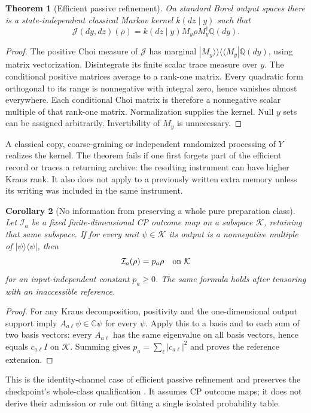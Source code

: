\documentclass[11pt,oneside,openany]{book}
\newtheorem{theorem}{Theorem}[chapter]
\newtheorem{corollary}[theorem]{Corollary}
\theoremstyle{definition}
\theoremstyle{remark}\newtheorem{remark}[theorem]{Remark}
\begin{document}
\begin{theorem}[Efficient passive refinement]
\label{cpc:thm:refinement}
On standard Borel output spaces there is a state-independent classical Markov kernel $k(dz\mid y)$ such that
\begin{equation}
 \mathcal J(dy,dz)(\rho)=k(dz\mid y)M_y\rho M_y^\dagger\mathbb Q(dy).
 \label{cpc:eq:passivekernel}
\end{equation}
\end{theorem}
\begin{proof}
The positive Choi measure of $\mathcal J$ has marginal $|M_y\rangle\!\rangle\langle\!\langle M_y|\mathbb Q(dy)$, using matrix vectorization. Disintegrate its finite scalar trace measure over $y$. The conditional positive matrices average to a rank-one matrix. Every quadratic form orthogonal to its range is nonnegative with integral zero, hence vanishes almost everywhere. Each conditional Choi matrix is therefore a nonnegative scalar multiple of that rank-one matrix. Normalization supplies the kernel. Null $y$ sets can be assigned arbitrarily. Invertibility of $M_y$ is unnecessary.
\end{proof}

A classical copy, coarse-graining or independent randomized processing of $Y$ realizes the kernel. The theorem fails if one first forgets part of the efficient record or traces a returning archive: the resulting instrument can have higher Kraus rank. It also does not apply to a previously written extra memory unless its writing was included in the same instrument.

\begin{corollary}[No information from preserving a whole pure preparation class]
\label{cpc:pure-class}
Let $\mathcal I_a$ be a fixed finite-dimensional CP outcome map on a
subspace $\mathcal K$, retaining that same subspace. If for every unit
$\psi\in\mathcal K$ its output is a nonnegative multiple of
$|\psi\rangle\langle\psi|$, then
\[
 \mathcal I_a(\rho)=p_a\rho\quad\hbox{on }\mathcal K
\]
for an input-independent constant $p_a\geq0$. The same formula holds
after tensoring with an inaccessible reference.
\end{corollary}
\begin{proof}
For any Kraus decomposition, positivity and the one-dimensional output
support imply $A_{a\ell}\psi\in\mathbb C\psi$ for every $\psi$.
Apply this to a basis and to each sum of two basis vectors: every
$A_{a\ell}$ has the same eigenvalue on all basis vectors, hence equals
$c_{a\ell}I$ on $\mathcal K$. Summing gives
$p_a=\sum_\ell|c_{a\ell}|^2$ and proves the reference extension.
\end{proof}
This is the identity-channel case of efficient passive refinement and
preserves the checkpoint's whole-class qualification \cite{C01}.
It assumes CP outcome maps; it does not derive their admission or rule
out fitting a single isolated probability table.
\end{document}
